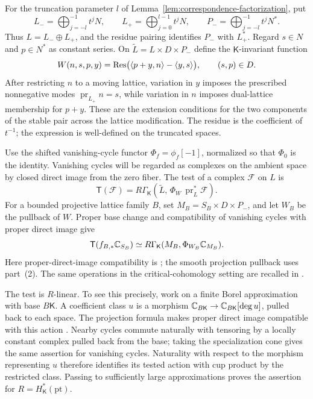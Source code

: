 For the truncation parameter $l$ of
Lemma~\ref{lem:correspondence-factorization}, put
\[
 L_-=\bigoplus_{j=-l}^{-1}t^jN,\qquad
 L_+=\bigoplus_{j=0}^{l-1}t^jN,\qquad
 P_-=\bigoplus_{j=-l}^{-1}t^jN^*.
\]
Thus $L=L_-\oplus L_+$, and the residue pairing identifies
$P_-$ with $L_+^*$.  Regard $s\in N$ and $p\in N^*$ as constant series.
On $\widetilde L=L\times D\times P_-$ define the $\mathsf K$-invariant
function
\begin{equation}
\label{eq:stable-test-function}
 W(n,s,p,y)=
 \operatorname{Res}\bigl(\langle p+y,n\rangle-\langle y,s\rangle\bigr),
 \qquad (s,p)\in D.
\end{equation}
After restricting $n$ to a moving lattice, variation in $y$ imposes the
prescribed nonnegative modes $\operatorname{pr}_{L_+}n=s$, while variation
in $n$ imposes dual-lattice membership for $p+y$.  These are the extension
conditions for the two components of the stable pair across the lattice
modification.
The residue is the coefficient of $t^{-1}$; the expression is
well-defined on the truncated spaces.

Use the shifted vanishing-cycle functor $\Phi_f=\phi_f[-1]$, normalized
so that $\Phi_0$ is the identity.  Vanishing cycles will be regarded
as complexes on the ambient space by closed direct image from the zero
fiber.  The test of a complex $\mathcal F$ on $L$ is
\begin{equation}
\label{eq:stable-test-functor}
 \mathsf T(\mathcal F)
 =R\Gamma_{\mathsf K}\!
 \left(\widetilde L,\,
 \Phi_W\,\operatorname{pr}_L^*\mathcal F\right).
\end{equation}
For a bounded projective lattice family $B$, set
$M_B=S_B\times D\times P_-$, and let $W_B$ be the pullback of $W$.
Proper base change and compatibility of vanishing cycles with proper
direct image give
\begin{equation}
\label{eq:stable-test-proper}
 \mathsf T(f_{B,*}\mathbb C_{S_B})
 \simeq R\Gamma_{\mathsf K}
       (M_B,\Phi_{W_B}\mathbb C_{M_B}).
\end{equation}
Here proper-direct-image compatibility is
\cite[Proposition~4.19(1)]{MaximSchurmann21}; the smooth projection
pullback uses part~(2).  The same operations in the critical-cohomology
setting are recalled in \cite[Appendix~A.1]{BottaTamagni26}.

The test is $R$-linear.  To see this precisely, work on a finite Borel
approximation with base $B\mathsf K$.  A coefficient class $u$ is a
morphism $\mathbb C_{B\mathsf K}\to\mathbb C_{B\mathsf K}[\deg u]$, pulled back to each
space.  The projection formula makes proper direct image compatible
with this action \cite[Theorem~6.3]{SchnurerSoergel16}.
Nearby cycles commute naturally with tensoring by a
locally constant complex pulled back from the base; taking the
specialization cone gives the same assertion for vanishing cycles.
Naturality with respect to the morphism representing $u$ therefore
identifies its tested action with cup product by the restricted class.
Passing to sufficiently large approximations proves the assertion for
$R=H_{\mathsf K}^*(\mathrm{pt})$.

